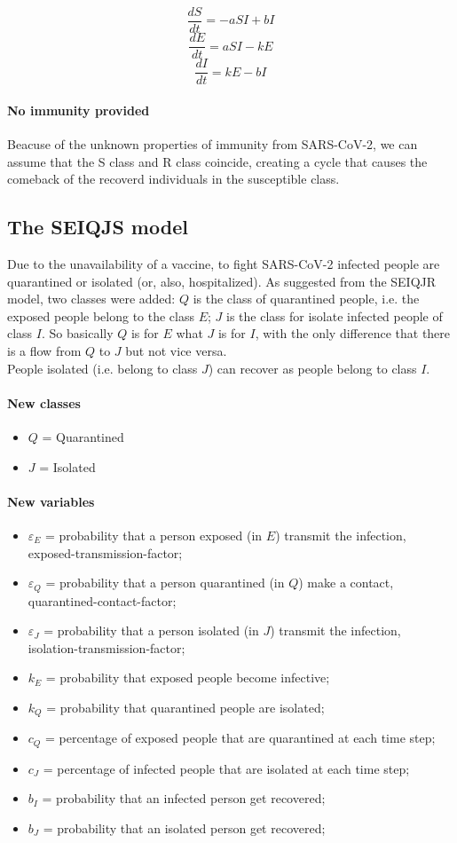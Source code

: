 \documentclass[12pt]{llncs}
\begin{document}
$$\frac{dS}{dt} = -aSI + bI$$
$$\frac{dE}{dt} = aSI - kE$$
$$\frac{dI}{dt} = kE - bI$$

\paragraph{\textbf{No immunity provided}}
Beacuse of the unknown properties of immunity from SARS-CoV-2, we can assume that the S class and R class coincide, creating a cycle that causes the comeback of the recoverd individuals in the susceptible class.

\subsection{The SEIQJS model}
Due to the unavailability of a vaccine, to fight SARS-CoV-2 infected people are quarantined or isolated (or, also, hospitalized). As suggested from the SEIQJR model, two classes were added: $Q$ is the class of quarantined people, i.e. the exposed people belong to the class $E$; $J$ is the class for isolate infected people of class $I$. So basically $Q$ is for $E$ what $J$ is for $I$, with the only difference that there is a flow from $Q$ to $J$ but not vice versa.\\
People isolated (i.e. belong to class $J$) can recover as people belong to class $I$.

\paragraph{New classes}
\begin{itemize}
\item $Q$ = Quarantined
\item $J$ = Isolated
\end{itemize}

\paragraph{New variables}
\begin{itemize}
\item $\varepsilon_E$ = probability that a person exposed (in $E$) transmit the infection, exposed-transmission-factor;
\item $\varepsilon_Q$ = probability that a person quarantined (in $Q$) make a contact, quarantined-contact-factor;
\item $\varepsilon_J$ = probability that a person isolated (in $J$) transmit the infection, isolation-transmission-factor;
\item $k_E$ = probability that exposed people become infective;
\item $k_Q$ = probability that quarantined people are isolated;
\item $c_Q$ = percentage of exposed people that are quarantined at each time step;
\item $c_J$ = percentage of infected people that are isolated at each time step;
\item $b_I$ = probability that an infected person get recovered;
\item $b_J$ = probability that an isolated person get recovered;
\end{itemize}
\end{document}

